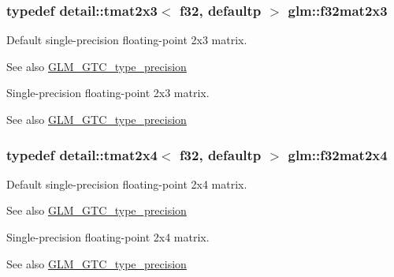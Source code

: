 \subsubsection[{\texorpdfstring{f32mat2x3}{f32mat2x3}}]{\setlength{\rightskip}{0pt plus 5cm}typedef detail\+::tmat2x3$<$ f32, defaultp $>$ {\bf glm\+::f32mat2x3}}\hypertarget{group__gtc__type__precision_ga5ad96c3a7d4c81520d1f30bf5dcdc2b6}{}\label{group__gtc__type__precision_ga5ad96c3a7d4c81520d1f30bf5dcdc2b6}
Default single-\/precision floating-\/point 2x3 matrix. \begin{DoxySeeAlso}{See also}
\hyperlink{group__gtc__type__precision}{G\+L\+M\+\_\+\+G\+T\+C\+\_\+type\+\_\+precision}
\end{DoxySeeAlso}
Single-\/precision floating-\/point 2x3 matrix. \begin{DoxySeeAlso}{See also}
\hyperlink{group__gtc__type__precision}{G\+L\+M\+\_\+\+G\+T\+C\+\_\+type\+\_\+precision} 
\end{DoxySeeAlso}
\subsubsection[{\texorpdfstring{f32mat2x4}{f32mat2x4}}]{\setlength{\rightskip}{0pt plus 5cm}typedef detail\+::tmat2x4$<$ f32, defaultp $>$ {\bf glm\+::f32mat2x4}}\hypertarget{group__gtc__type__precision_gaba05bfeff59b12ea8e8ad2f6bfd8eece}{}\label{group__gtc__type__precision_gaba05bfeff59b12ea8e8ad2f6bfd8eece}
Default single-\/precision floating-\/point 2x4 matrix. \begin{DoxySeeAlso}{See also}
\hyperlink{group__gtc__type__precision}{G\+L\+M\+\_\+\+G\+T\+C\+\_\+type\+\_\+precision}
\end{DoxySeeAlso}
Single-\/precision floating-\/point 2x4 matrix. \begin{DoxySeeAlso}{See also}
\hyperlink{group__gtc__type__precision}{G\+L\+M\+\_\+\+G\+T\+C\+\_\+type\+\_\+precision} 
\end{DoxySeeAlso}
